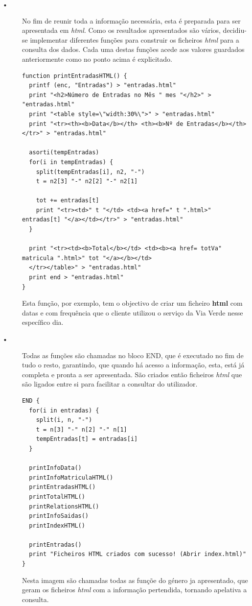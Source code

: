 \documentclass{report}
\begin{document}
\begin{description}
\item[•] No fim de reunir toda a informação necessária, esta é preparada para ser apresentada em \textit{html}. Como os resultados apresentados são vários, decidiu-se implementar diferentes funções para construir os ficheiros \textit{html} para a consulta dos dados. Cada uma destas funções acede aos valores guardados anteriormente como no ponto acima é explicitado. \\

\begin{verbatim}
function printEntradasHTML() {
  printf (enc, "Entradas") > "entradas.html"
  print "<h2>Número de Entradas no Mês " mes "</h2>" > "entradas.html"
  print "<table style=\"width:30%\">" > "entradas.html"
  print "<tr><th><b>Data</b></th> <th><b>Nº de Entradas</b></th></tr>" > "entradas.html"

  asorti(tempEntradas)
  for(i in tempEntradas) {
    split(tempEntradas[i], n2, "-")
    t = n2[3] "-" n2[2] "-" n2[1]

    tot += entradas[t]
    print "<tr><td>" t "</td> <td><a href=" t ".html>" entradas[t] "</a></td></tr>" > "entradas.html"
  }

  print "<tr><td><b>Total</b></td> <td><b><a href= totVa" matricula ".html>" tot "</a></b></td>
  </tr></table>" > "entradas.html"
  print end > "entradas.html"
}
\end{verbatim}

Esta função, por exemplo, tem o objectivo de criar um ficheiro \textbf{html} com datas e com frequência que o cliente utilizou o serviço da Via Verde nesse específico dia.\\

\item[•] Todas as funções são chamadas no bloco END, que é executado no fim de tudo o resto, garantindo, que quando há acesso a informação, esta, está já completa e pronta a ser apresentada. São criados então ficheiros \textit{html} que são ligados entre si para facilitar a consultar do utilizador.\\

\begin{verbatim}
END {
  for(i in entradas) {
    split(i, n, "-")
    t = n[3] "-" n[2] "-" n[1]
    tempEntradas[t] = entradas[i]
  }

  printInfoData()
  printInfoMatriculaHTML()
  printEntradasHTML()
  printTotalHTML()
  printRelationsHTML()
  printInfoSaidas()
  printIndexHTML()

  printEntradas()
  print "Ficheiros HTML criados com sucesso! (Abrir index.html)"
}
\end{verbatim}

Nesta imagem são chamadas todas as funçõe do género ja apresentado, que geram os ficheiros \textit{html} com a informação pertendida, tornando apelativa a consulta.\\


\end{description}
\end{document}
